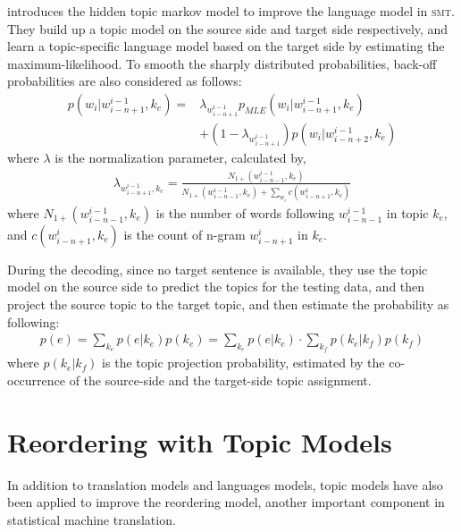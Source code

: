 
\citet{Yu-2013} introduces the hidden topic markov model to improve the language model in \textsc{smt}. They build up a topic model on the source side and target side respectively, and learn a topic-specific language model based on the target side by estimating the maximum-likelihood. To smooth the sharply distributed probabilities, back-off probabilities are also considered as follows:
\begin{align}
p(w_i | w^{i-1}_{i-n+1}, k_e) = &\lambda_{w^{i-1}_{i-n+1}} p_{MLE}(w_i|w^{i-1}_{i-n+1}, k_e) \\
&+ (1- \lambda_{w^{i-1}_{i-n+1}})p(w_i|w^{i-1}_{i-n+2}, k_e)
\end{align}
where $\lambda$ is the normalization parameter, calculated by,
\begin{align}
\lambda_{w^{i-1}_{i-n+1}, k_e} = \frac{N_{1+}(w^{i-1}_{i-n-1}, k_e)}{N_{1+}(w^{i-1}_{i-n-1}, k_e) + \sum_{w_i}c(w^i_{i-n+1}, k_e)}
\end{align}
where $N_{1+}(w^{i-1}_{i-n-1}, k_e)$ is the number of words following $w^{i-1}_{i-n-1}$ in topic $k_e$, and $c(w^i_{i-n+1}, k_e)$ is the count of n-gram $w^i_{i-n+1}$ in $k_e$.

During the decoding, since no target sentence is available, they use the topic model on the source side to predict the topics for the testing data, and then project the source topic to the target topic, and then estimate the probability as following:
\begin{align}
p(e) = \sum_{k_e} p(e|k_e) p(k_e) = \sum_{k_e} p(e|k_e) \cdot \sum_{k_f} p(k_e|k_f) p (k_f)
\end{align}
where $p(k_e|k_f)$ is the topic projection probability, estimated by the co-occurrence of the source-side and the target-side topic assignment.

\section{Reordering with Topic Models}

In addition to translation models and languages models, topic models have also been applied to improve the reordering model, another important component in statistical machine translation.


